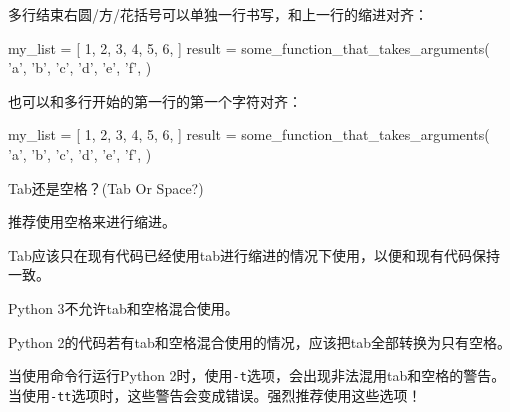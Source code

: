 \documentclass[ignorenonframetext,9pt]{beamer}
\newenvironment{Shaded}{}{}
\newcommand{\DecValTok}[1]{\textcolor[rgb]{0.25,0.63,0.44}{#1}}
\newcommand{\NormalTok}[1]{#1}
\newcommand{\OperatorTok}[1]{\textcolor[rgb]{0.40,0.40,0.40}{#1}}
\newcommand{\StringTok}[1]{\textcolor[rgb]{0.25,0.44,0.63}{#1}}
\begin{document}
\begin{frame}[fragile]

多行结束右圆/方/花括号可以单独一行书写，和上一行的缩进对齐：

\begin{Shaded}
\begin{Highlighting}[]
\NormalTok{my_list }\OperatorTok{=}\NormalTok{ [}
    \DecValTok{1}\NormalTok{, }\DecValTok{2}\NormalTok{, }\DecValTok{3}\NormalTok{,}
    \DecValTok{4}\NormalTok{, }\DecValTok{5}\NormalTok{, }\DecValTok{6}\NormalTok{,}
\NormalTok{    ]}
\NormalTok{result }\OperatorTok{=}\NormalTok{ some_function_that_takes_arguments(}
    \StringTok{'a'}\NormalTok{, }\StringTok{'b'}\NormalTok{, }\StringTok{'c'}\NormalTok{,}
    \StringTok{'d'}\NormalTok{, }\StringTok{'e'}\NormalTok{, }\StringTok{'f'}\NormalTok{,}
\NormalTok{    )}
\end{Highlighting}
\end{Shaded}
\end{frame}

\begin{frame}[fragile]

也可以和多行开始的第一行的第一个字符对齐：

\begin{Shaded}
\begin{Highlighting}[]
\NormalTok{my_list }\OperatorTok{=}\NormalTok{ [}
    \DecValTok{1}\NormalTok{, }\DecValTok{2}\NormalTok{, }\DecValTok{3}\NormalTok{,}
    \DecValTok{4}\NormalTok{, }\DecValTok{5}\NormalTok{, }\DecValTok{6}\NormalTok{,}
\NormalTok{]}
\NormalTok{result }\OperatorTok{=}\NormalTok{ some_function_that_takes_arguments(}
    \StringTok{'a'}\NormalTok{, }\StringTok{'b'}\NormalTok{, }\StringTok{'c'}\NormalTok{,}
    \StringTok{'d'}\NormalTok{, }\StringTok{'e'}\NormalTok{, }\StringTok{'f'}\NormalTok{,}
\NormalTok{)}
\end{Highlighting}
\end{Shaded}

\end{frame}

\begin{frame}{Tab还是空格？(Tab Or Space?)}


推荐使用空格来进行缩进。

Tab应该只在现有代码已经使用tab进行缩进的情况下使用，以便和现有代码保持一致。

Python 3不允许tab和空格混合使用。

Python 2的代码若有tab和空格混合使用的情况，应该把tab全部转换为只有空格。

当使用命令行运行Python
2时，使用\texttt{-t}选项，会出现非法混用tab和空格的警告。当使用\texttt{-tt}选项时，这些警告会变成错误。强烈推荐使用这些选项！

\end{frame}
\end{document}
